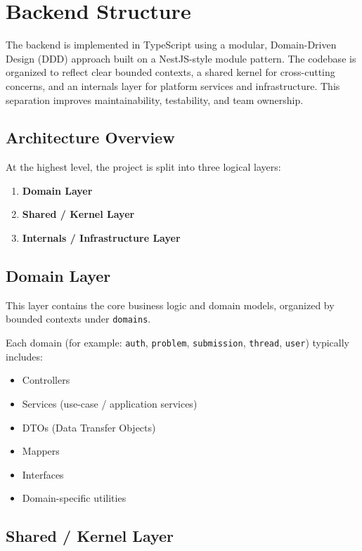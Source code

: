 \section{Backend Structure}

The backend is implemented in TypeScript using a modular, Domain-Driven Design (DDD) approach built on a NestJS-style module pattern. The codebase is organized to reflect clear bounded contexts, a shared kernel for cross-cutting concerns, and an internals layer for platform services and infrastructure. This separation improves maintainability, testability, and team ownership.

\subsection{Architecture Overview}

At the highest level, the project is split into three logical layers:

\begin{enumerate}
	\item \textbf{Domain Layer}
	\item \textbf{Shared / Kernel Layer}
	\item \textbf{Internals / Infrastructure Layer}
\end{enumerate}

\subsection{Domain Layer}

This layer contains the core business logic and domain models, organized by bounded contexts under \texttt{domains}.

Each domain (for example: \texttt{auth}, \texttt{problem}, \texttt{submission}, \texttt{thread}, \texttt{user}) typically includes:

\begin{itemize}
	\item Controllers
	\item Services (use-case / application services)
	\item DTOs (Data Transfer Objects)
	\item Mappers
	\item Interfaces
	\item Domain-specific utilities
\end{itemize}

\subsection{Shared / Kernel Layer}

